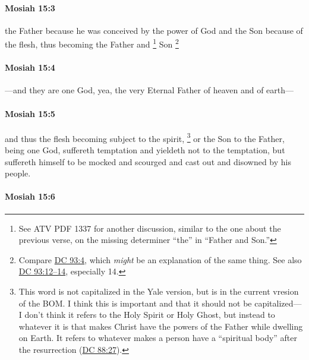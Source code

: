 		\paragraph{Mosiah 15:3} %
			\label{MOSIAH-15-3}

			the Father because he was conceived by the power of God
			and the Son because of the flesh,
			thus becoming the Father and
				\footnote{%
					See ATV PDF 1337 for another discussion, similar to the one about the previous verse, on the missing determiner ``the'' in ``Father and Son.''
					}%
			Son%
				\footnote{%
					Compare \hyperref[DC93-4]{DC 93:4}, which \textit{might} be an explanation of the same thing. See also \hyperref[DC93-12]{DC 93:12--14}, especially 14.
					}

		\paragraph{Mosiah 15:4} %
			\label{MOSIAH-15-4}

			---and they are one God,
			yea, the very Eternal Father of heaven and of earth---

		\paragraph{Mosiah 15:5} %
			\label{MOSIAH-15-5}

			and thus the flesh becoming subject to the spirit,%
				\footnote{%
					\label{MOSIAH-15-5-spirit}%
					This word is not capitalized in the Yale version, but is in the current vresion of the BOM. I think this is important and that it should not be capitalized---I don't think it refers to the Holy Spirit or Holy Ghost, but instead to whatever it is that makes Christ have the powers of the Father while dwelling on Earth. It refers to whatever makes a person have a ``spiritual body'' after the resurrection (\hyperref[DC88-27]{DC 88:27}).
					}
			or the Son to the Father, being one God,
			suffereth temptation and yieldeth not to the temptation,
			but suffereth himself to be mocked and scourged
			and cast out and disowned by his people.

		\paragraph{Mosiah 15:6} %
			\label{MOSIAH-15-6}

